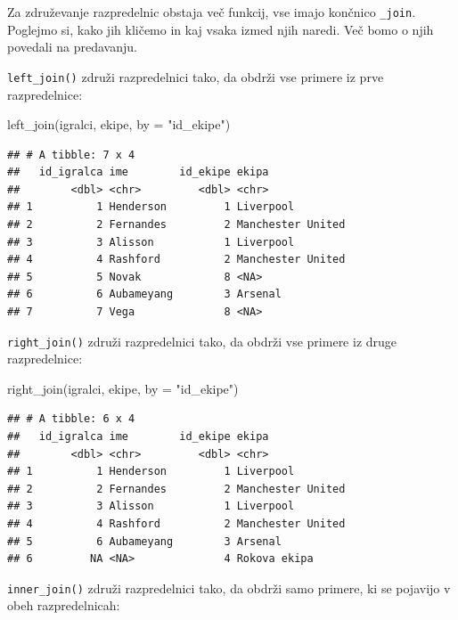 \documentclass[
]{book}
\newenvironment{Shaded}{\begin{snugshade}}{\end{snugshade}}
\newcommand{\AttributeTok}[1]{\textcolor[rgb]{0.77,0.63,0.00}{#1}}
\newcommand{\FunctionTok}[1]{\textcolor[rgb]{0.00,0.00,0.00}{#1}}
\newcommand{\NormalTok}[1]{#1}
\newcommand{\StringTok}[1]{\textcolor[rgb]{0.31,0.60,0.02}{#1}}
\begin{document}
Za združevanje razpredelnic obstaja več funkcij, vse imajo končnico \texttt{\_join}. Poglejmo si, kako jih kličemo in kaj vsaka izmed njih naredi. Več bomo o njih povedali na predavanju.

\texttt{left\_join()} združi razpredelnici tako, da obdrži vse primere iz prve razpredelnice:

\begin{Shaded}
\begin{Highlighting}[]
\FunctionTok{left\_join}\NormalTok{(igralci, ekipe, }\AttributeTok{by =} \StringTok{"id\_ekipe"}\NormalTok{)}
\end{Highlighting}
\end{Shaded}

\begin{verbatim}
## # A tibble: 7 x 4
##   id_igralca ime        id_ekipe ekipa            
##        <dbl> <chr>         <dbl> <chr>            
## 1          1 Henderson         1 Liverpool        
## 2          2 Fernandes         2 Manchester United
## 3          3 Alisson           1 Liverpool        
## 4          4 Rashford          2 Manchester United
## 5          5 Novak             8 <NA>             
## 6          6 Aubameyang        3 Arsenal          
## 7          7 Vega              8 <NA>
\end{verbatim}

\texttt{right\_join()} združi razpredelnici tako, da obdrži vse primere iz druge razpredelnice:

\begin{Shaded}
\begin{Highlighting}[]
\FunctionTok{right\_join}\NormalTok{(igralci, ekipe, }\AttributeTok{by =} \StringTok{"id\_ekipe"}\NormalTok{)}
\end{Highlighting}
\end{Shaded}

\begin{verbatim}
## # A tibble: 6 x 4
##   id_igralca ime        id_ekipe ekipa            
##        <dbl> <chr>         <dbl> <chr>            
## 1          1 Henderson         1 Liverpool        
## 2          2 Fernandes         2 Manchester United
## 3          3 Alisson           1 Liverpool        
## 4          4 Rashford          2 Manchester United
## 5          6 Aubameyang        3 Arsenal          
## 6         NA <NA>              4 Rokova ekipa
\end{verbatim}

\texttt{inner\_join()} združi razpredelnici tako, da obdrži samo primere, ki se pojavijo v obeh razpredelnicah:
\end{document}
